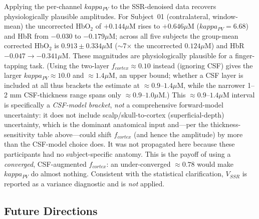\documentclass[12pt]{article}
\def\kappa{kappa}%
\def\text#1{#1}%
\def\,{ }%
\begin{document}
Applying the per-channel $\kappa_{\text{PV}}$ to the SSR-denoised data recovers physiologically plausible amplitudes. For Subject~01 (contralateral, window-mean) the uncorrected HbO$_2$ of $+0.144\,\mu$M rises to $+0.646\,\mu$M ($\kappa_{\text{PV}}=6.68$) and HbR from $-0.030$ to $-0.179\,\mu$M; across all five subjects the group-mean corrected HbO$_2$ is $0.913 \pm 0.334\,\mu$M ($\sim$7$\times$ the uncorrected $0.124\,\mu$M) and HbR $-0.047\rightarrow-0.341\,\mu$M. These magnitudes are physiologically plausible for a finger-tapping task. (Using the two-layer $f_{\text{cortex}}\approx0.10$ instead (ignoring CSF) gives the larger $\kappa_{\text{PV}}\approx10.0$ and $\approx1.4\,\mu$M, an upper bound; whether a CSF layer is included at all thus brackets the estimate at $\approx0.9$--$1.4\,\mu$M, while the narrower 1--2\,mm CSF-thickness range spans only $\approx0.9$--$1.0\,\mu$M.) This $\approx0.9$--$1.4\,\mu$M interval is specifically a \emph{CSF-model bracket}, \emph{not} a comprehensive forward-model uncertainty: it does not include scalp/skull-to-cortex (superficial-depth) uncertainty, which is the dominant anatomical input and---per the thickness-sensitivity table above---could shift $f_{\text{cortex}}$ (and hence the amplitude) by more than the CSF-model choice does. It was not propagated here because these participants had no subject-specific anatomy. This is the payoff of using a \emph{converged}, CSF-augmented $f_{\text{cortex}}$: an under-converged $\approx0.78$ would make $\kappa_{\text{PV}}$ do almost nothing. Consistent with the statistical clarification, $V_{\text{SSR}}$ is reported as a variance diagnostic and is \emph{not} applied.

\subsection{Future Directions}
\end{document}
